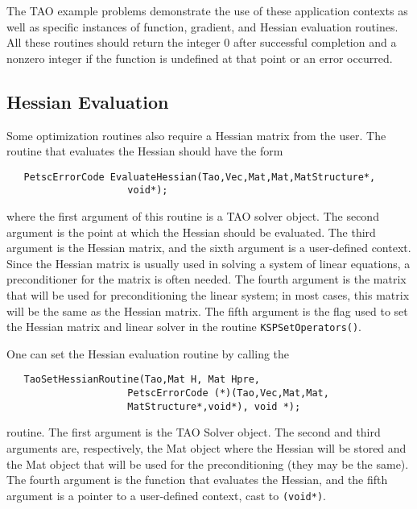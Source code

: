 The TAO example problems demonstrate the use of these application contexts
as well as specific instances of function, gradient, and Hessian 
evaluation routines.
All these routines should return the integer $0$ after 
successful completion and a nonzero integer if the function
is undefined at that point or an error occurred.

\subsection{Hessian Evaluation}
\label{sec:matrixfree}
\label{sec:finitedifference}

Some optimization routines also require a Hessian matrix from the user.
The routine that evaluates the Hessian should have the form 
\begin{verbatim}
   PetscErrorCode EvaluateHessian(Tao,Vec,Mat,Mat,MatStructure*,
                     void*);
\end{verbatim}
where the first argument of this routine is a TAO solver object.  The
second
argument is the point at which the Hessian should be evaluated.  The
third argument is the Hessian matrix, and the sixth argument is a
user-defined context.
Since the Hessian matrix is usually used in solving
a system of linear equations, a preconditioner for the matrix is often
needed.  The fourth argument is the matrix that will be used
for preconditioning the linear system; in most cases, this
matrix will be the same as the Hessian matrix.  The fifth
argument is the flag used to set the Hessian matrix and
linear solver in the routine {\tt KSPSetOperators()}.

One can set the Hessian evaluation routine by calling the 
\begin{verbatim}
   TaoSetHessianRoutine(Tao,Mat H, Mat Hpre,
                     PetscErrorCode (*)(Tao,Vec,Mat,Mat,
                     MatStructure*,void*), void *);
\end{verbatim}
routine. 
The first argument is the TAO Solver object. The second and third arguments
are, respectively, the Mat object where the Hessian will be stored and 
the Mat object
that will be used for the preconditioning (they may be the same). The fourth 
argument is the function that evaluates the Hessian, 
and the fifth argument is a pointer to a user-defined context,
cast to {\tt (void*)}.

